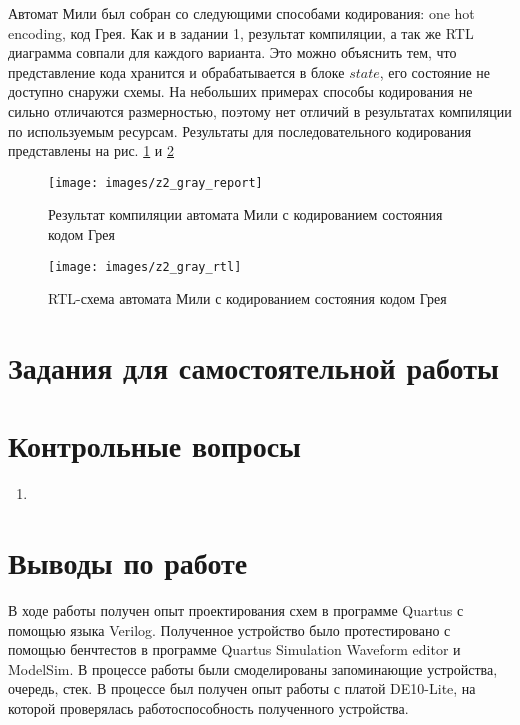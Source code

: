 \documentclass[a4paper,14pt]{article}
\begin{document}
	Автомат Мили был собран со следующими способами кодирования: one hot encoding, код Грея.
	Как и в задании 1, результат компиляции, а так же RTL диаграмма совпали для каждого варианта.
	Это можно объяснить тем, что представление кода хранится и обрабатывается в блоке $state$, его состояние не доступно снаружи схемы.
	На небольших примерах способы кодирования не сильно отличаются размерностью, поэтому нет отличий в результатах компиляции по используемым ресурсам.
	Результаты для последовательного кодирования представлены на рис. \ref{fig:z2_gray_report} и \ref{fig:z2_gray_rtl}
	
	\begin{figure}[H]
		\centering
		\texttt{[image: images/z2\_gray\_report]}
		\caption{Результат компиляции автомата Мили с кодированием состояния кодом Грея}
		\label{fig:z2_gray_report}
	\end{figure}	
	
	\begin{figure}[H]
		\centering
		\texttt{[image: images/z2\_gray\_rtl]}
		\caption{RTL-схема автомата Мили с кодированием состояния кодом Грея}
		\label{fig:z2_gray_rtl}
	\end{figure}

	\section{Задания для самостоятельной работы}

			
	\section{Контрольные вопросы}
	
	\begin{enumerate}
		\item 	
		
	\end{enumerate}
	
	\section{Выводы по работе}
	
	В ходе работы получен опыт проектирования схем в программе Quartus с помощью языка Verilog.
	Полученное устройство было протестировано с помощью бенчтестов в программе Quartus Simulation Waveform editor и ModelSim.
	В процессе работы были смоделированы запоминающие устройства, очередь, стек.
	В процессе был получен опыт работы с платой DE10-Lite, на которой проверялась работоспособность полученного устройства.
	
\end{document}
